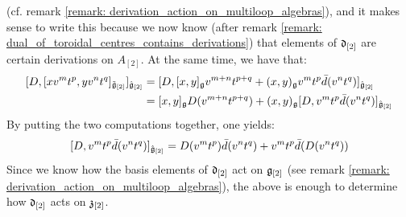 \begin{remark}
            (cf. remark \ref{remark: derivation_action_on_multiloop_algebras}), and it makes sense to write this because we now know (after remark \ref{remark: dual_of_toroidal_centres_contains_derivations}) that elements of $\mathfrak{d}_{[2]}$ are certain derivations on $A_{[2]}$. At the same time, we have that:
                $$
                    \begin{aligned}
                        [ D, [x v^m t^p, y v^n t^q]_{\tilde{\g}_{[2]}} ]_{\hat{\g}_{[2]}} & = [ D, [x, y]_{\g} v^{m + n} t^{p + q} + (x, y)_{\g} v^m t^p \bar{d}(v^n t^q) ]_{\hat{\g}_{[2]}}
                        \\
                        & = [x, y]_{\g} D(v^{m + n} t^{p + q}) + (x, y)_{\g} [D, v^m t^p \bar{d}(v^n t^q)]_{\hat{\g}_{[2]}}
                    \end{aligned}
                $$
            By putting the two computations together, one yields:
                $$[D, v^m t^p \bar{d}(v^n t^q)]_{\hat{\mathfrak{g}}_{[2]}} = D(v^m t^p) \bar{d}(v^n t^q) + v^m t^p \bar{d}(D(v^n t^q))$$
            Since we know how the basis elements of $\mathfrak{d}_{[2]}$ act on $\mathfrak{g}_{[2]}$ (see remark \ref{remark: derivation_action_on_multiloop_algebras}), the above is enough to determine how $\mathfrak{d}_{[2]}$ acts on $\mathfrak{z}_{[2]}$. 


\end{remark}

